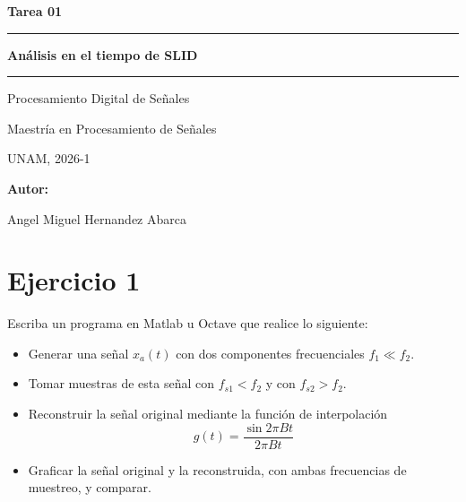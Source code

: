 \documentclass[12pt,a4paper]{article}
\begin{document}
\begin{titlepage}
\centering
\vspace*{2cm}

{\Large\textbf{Tarea 01}\par}

\vspace{0.5cm}
\rule{10cm}{0.5pt}

\vspace{1.5cm}

{\LARGE\textbf{Análisis en el tiempo de SLID}\par}

\vspace{0.5cm}
\rule{10cm}{0.3pt}

\vspace{2cm}

{\Large Procesamiento Digital de Señales\par}

\vspace{0.3cm}
{\large Maestría en Procesamiento de Señales\par}
{\large UNAM, 2026-1\par}

\vfill

\vspace{2cm}

{\Large\textbf{Autor:}\par}
{\large Angel Miguel Hernandez Abarca\par}

\vspace{2cm}

\end{titlepage}

\newpage
\section*{Ejercicio 1}

Escriba un programa en Matlab u Octave que realice lo siguiente:

\begin{itemize}
\item Generar una señal $x_a(t)$ con dos componentes frecuenciales $f_1 \ll f_2$.
\item Tomar muestras de esta señal con $f_{s1} < f_2$ y con $f_{s2} > f_2$.
\item Reconstruir la señal original mediante la función de interpolación
\begin{equation}
g(t) = \frac{\sin 2\pi B t}{2\pi B t}
\end{equation}
\item Graficar la señal original y la reconstruida, con ambas frecuencias de muestreo, y comparar.
\end{itemize}
\end{document}
